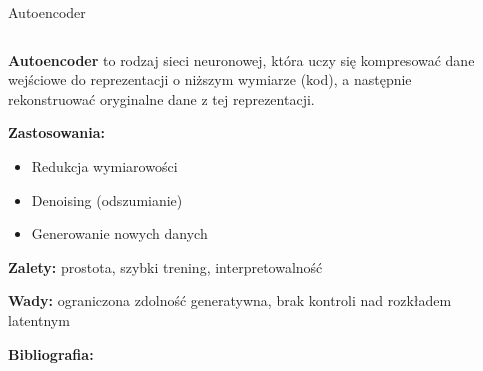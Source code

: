 \documentclass{beamer}
\begin{document}
\begin{frame}{Autoencoder}
  \begin{columns}
    \begin{column}{0.6\textwidth}
    \textbf{Autoencoder} to rodzaj sieci neuronowej, która uczy się kompresować dane wejściowe do reprezentacji o niższym wymiarze (kod), a następnie rekonstruować oryginalne dane z tej reprezentacji.
    
    \medskip
    \textbf{Zastosowania:}
    \begin{itemize}
    \item Redukcja wymiarowości
    \item Denoising (odszumianie)
    \item Generowanie nowych danych
    \end{itemize}
    
    \textbf{Zalety:} prostota, szybki trening, interpretowalność
    
    \textbf{Wady:} ograniczona zdolność generatywna, brak kontroli nad rozkładem latentnym
    
    \textbf{Bibliografia:} \cite{hinton2006reducing}
    \end{column}
    \begin{column}{0.4\textwidth}
    \centering
    \end{column}
  \end{columns}
\end{frame}
\end{document}
